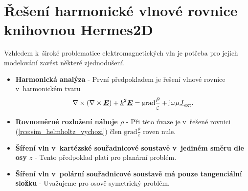 \section{Řešení harmonické vlnové rovnice knihovnou Hermes2D} \label{sec:sim_hermes2d}
Vzhledem k~široké problematice elektromagnetických vln je potřeba pro jejich modelování zavést některé zjednodušení. 
\begin{itemize}
\item {\bf Harmonická analýza} - První předpokladem je řešení vlnové rovnice v~harmonickém tvaru
\begin{equation}
	\nabla\times(\nabla\times\mbox{\underline{\boldmath$E$}}) +{\underline{k}}^{2}\mbox{\underline{\boldmath$E$}} = \mathrm{grad}\frac{\rho}{\varepsilon} + \mathrm{j}\omega\mu{\underline{J}}_{\mathrm{ext}}.
    \label{rce:sim_helmholtz_vychozi} 
\end{equation}
\item {\bf Rovnoměrné rozložení náboje $\rho$} - Při této úvaze je v~řešené rovnici (\ref{rce:sim_helmholtz_vychozi}) člen $\mathrm{grad}\frac{\rho}{\varepsilon}$ roven nule.
\item {\bf Šíření vln v~kartézské souřadnicové soustavě v~jediném směru dle osy $z$} - Tento předpoklad platí pro planární problém.
\item {\bf Šíření vln v~polární souřadnicové soustavě má pouze tangenciální složku} - Uvažujeme pro osově symetrický problém.
\end{itemize}

